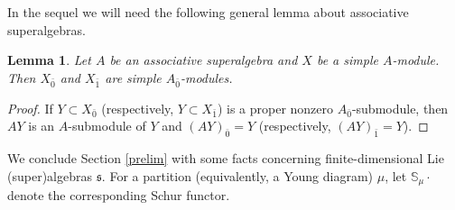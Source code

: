 \documentclass[12pt]{amsart}
\makeatletter
\def\@putname#1#2#3#4{\def\@@ref{#3}\let\old@bf\bf
        \def\bf##1{\old@bf\if?\noexpand##1?{#4}\else##1\fi}%
	#1{#2}%
        \let\bf\old@bf}
\def\@putname#1#2#3#4{\def\@@ref{#3}\let\old@bf\bf	%
	\let\old@reset@font\reset@font			%
        \def\bf##1{\old@bf\if?\noexpand##1?{#4}\else##1\fi}%
	\def\reset@font##1##2{\old@reset@font##1\if?\noexpand##2?{#4}\else##2\fi}#1{#2}%
        \let\bf\old@bf\let\reset@font\old@reset@font}
\let\my@ref=\ref
\def\ref#1{\@putname\my@ref{#1}{#1}{\tiny\rm\@@ref}}
\theoremstyle{plain} %
\numberwithin{equation}{section}
\theoremstyle{definition}
\theoremstyle{remark}
\theoremstyle{plain} %
\newtheorem{lemma}[definition]{Lemma}
\makeatother
\begin{document}
  In the sequel we will need the following general lemma about associative superalgebras.

 \begin{lemma}\label{associative} Let $A$ be an associative superalgebra and $X$ be a simple $A$-module. Then $X_{\bar 0}$ and $X_{\bar 1}$ are simple
   $A_{\bar 0}$-modules.
 \end{lemma}
 \begin{proof} If $Y\subset X_{\bar 0}$ (respectively, $Y\subset X_{\bar 1}$) is a proper nonzero $A_{\bar 0}$-submodule, then $AY$ is an $A$-submodule of $Y$
   and 
   $(AY)_{\bar 0}=Y$ (respectively, $(AY)_{\bar 1}=Y$).
   \end{proof}


 
We conclude  Section \ref{prelim} with some facts concerning finite-dimensional Lie (super)algebras $\mathfrak s$. For a partition (equivalently, a Young diagram) $\mu$, let $\mathbb S_{\mu} \cdot$ denote the corresponding Schur functor. 
\end{document}
